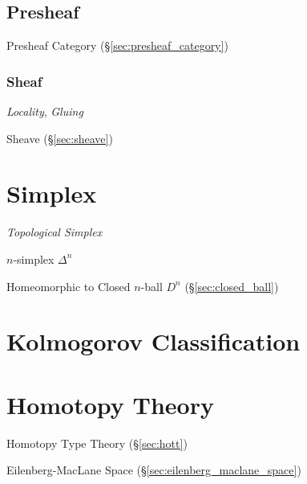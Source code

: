\subsection{Presheaf}\label{sec:presheaf}

Presheaf Category (\S\ref{sec:presheaf_category})



\subsubsection{Sheaf}\label{sec:sheaf}

\emph{Locality}, \emph{Gluing}

Sheave (\S\ref{sec:sheave})



\section{Simplex}\label{sec:simplex}

\emph{Topological Simplex}

$n$-simplex $\Delta^n$

Homeomorphic to Closed $n$-ball $D^n$ (\S\ref{sec:closed_ball})



\section{Kolmogorov Classification}\label{sec:kolmogorov_classification}

\section{Homotopy Theory}\label{sec:homotopy_theory}

Homotopy Type Theory (\S\ref{sec:hott})

Eilenberg-MacLane Space (\S\ref{sec:eilenberg_maclane_space})



